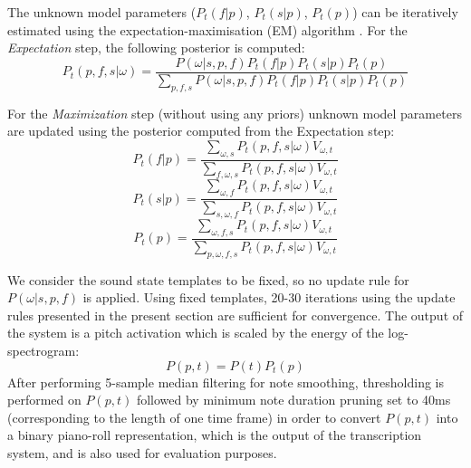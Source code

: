 The unknown model parameters ($P_{t}(f|p)$, $P_{t}(s|p)$, $P_{t}(p)$) can be iteratively estimated using the expectation-maximisation (EM) algorithm \cite{Dempster77}. For the \emph{Expectation} step, the following posterior is computed:
 \begin{equation}
  P_{t}(p,f,s|\omega) = \frac{P(\omega|s,p,f)P_{t}(f|p)P_{t}(s|p)P_{t}(p)}{\sum_{p,f,s}P(\omega|s,p,f)P_{t}(f|p)P_{t}(s|p)P_{t}(p)} \label{eq:EStep}
 \end{equation}
  
For the \emph{Maximization} step (without using any priors) unknown model parameters are updated using the posterior computed from the Expectation step:
 \begin{equation}
 P_{t}(f|p) = \frac{\sum_{\omega,s}P_{t}(p,f,s|\omega)V_{\omega,t}}{\sum_{f,\omega,s}P_{t}(p,f,s|\omega)V_{\omega,t}} 
\end{equation}
\begin{equation}
 P_{t}(s|p) = \frac{\sum_{\omega,f}P_{t}(p,f,s|\omega)V_{\omega,t}}{\sum_{s,\omega,f}P_{t}(p,f,s|\omega)V_{\omega,t}} \label{eq:MStepInstrument}
\end{equation}
\begin{equation}
 P_{t}(p) = \frac{\sum_{\omega,f,s}P_{t}(p,f,s|\omega)V_{\omega,t}}{\sum_{p,\omega,f,s}P_{t}(p,f,s|\omega)V_{\omega,t}} \label{eq:MStepTranscription}
\end{equation}


We consider the sound state templates to be fixed, so no update rule for $P(\omega|s,p,f)$ is applied. Using fixed templates, 20-30 iterations using the update rules presented in the present section are sufficient for convergence. The output of the system is a pitch activation which is scaled by the energy of the log-spectrogram:
\begin{equation}
P(p,t) =  P(t)P_{t}(p)\label{eq:transcription}
\end{equation}
After performing 5-sample median filtering for note smoothing, thresholding is performed on $P(p,t)$ followed by minimum note duration pruning set to 40ms (corresponding to the length of one time frame) in order to convert $P(p,t)$ into a binary piano-roll representation, which is the output of the transcription system, and is also used for evaluation purposes. 
